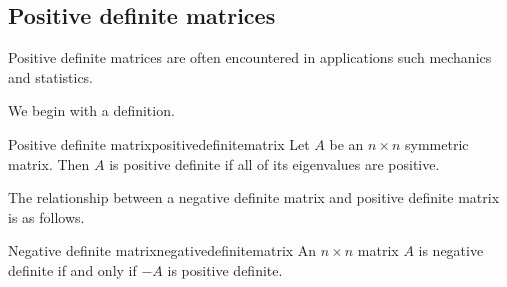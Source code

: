 \subsection{Positive definite matrices}

Positive definite matrices are often encountered in applications such mechanics and statistics.

We begin with a definition.

\begin{definition}{Positive definite matrix}{positivedefinitematrix}
Let $A$ be an $n \times n$ symmetric matrix. Then $A$ is positive definite if all of its eigenvalues are positive.
\end{definition}

The relationship between a negative definite matrix and positive definite matrix is as follows. 

\begin{lemma}{Negative definite matrix}{negativedefinitematrix}
An $n\times n$ matrix $A$ is negative definite if and only if $-A$ is
positive definite.
\end{lemma}


